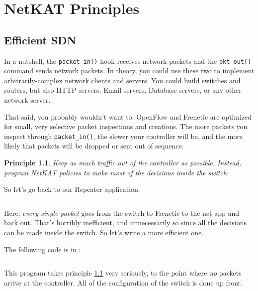 
\chapter{NetKAT Principles}

\newtheorem{principle}{Principle}

\section{Efficient SDN}
\label{netkat_principles:efficient_sdn}

In a nutshell, the \texttt{packet\_in()} hook receives network packets and the \texttt{pkt\_out()} command sends
network packets.  
In theory, you could use these two to implement arbitrarily-complex network clients and servers.  
You could build switches and routers, but also HTTP servers, Email servers, Database servers, or any other 
network server.  

That said, you probably wouldn't want to.
OpenFlow and Frenetic are optimized for small, very selective packet inspections and creations.  
The more packets you inspect through \texttt{packet\_in()}, the slower your controller will be, and
the more likely that packets will be dropped or sent out of sequence.  

\begin{principle}
\label{principle:controller}
Keep as much traffic out of the controller as possible.
Instead, program NetKAT policies to make most of the decisions inside the switch.  
\end{principle}

So let's go back to our Repeater application:

\inputminted{python}{code/quick_start/repeater.py}

Here, \emph{every single packet} goes from the switch to Frenetic to the net app and back out. 
That's horribly inefficient, and unnecessarily so since all the decisions can be made inside the switch.
So let's write a more efficient one.

The following code is in :

\inputminted{python}{code/netkat_principles/repeater2.py}

This program takes principle \ref{principle:controller} very seriously, to the point where \emph{no} packets 
arrive at the controller.
All of the configuration of the switch is done up front.


